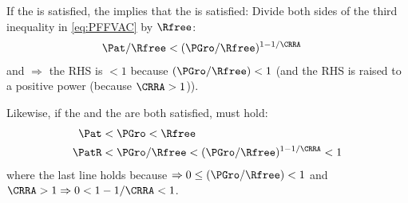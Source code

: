 \documentclass[BufferStockTheory]{subfiles}
\begin{document}
If the {\FHWC} is satisfied, the {\PFFVAC} implies that the {\RIC} is satisfied: Divide both sides of the third inequality in \eqref{eq:PFFVAC} by $\Rfree$:
\begin{align}
   \Pat/\Rfree & < (\PGro/\Rfree)^{1-1/\CRRA}  \label{eq:FHWCandPFFVACimplyRIC}
\end{align}
and {\FHWC} $\Rightarrow$ the RHS is $< 1$ because $(\PGro/\Rfree) < 1$ (and the RHS is raised to a positive power (because $\CRRA>1$)).

Likewise, if the {\FHWC} and the {\GIC} are both satisfied, {\PFFVAC} must hold:
\begin{align}
 \Pat & < \PGro < \Rfree \notag
\\   \PatR & < \PGro/\Rfree < (\PGro/\Rfree)^{1-1/\CRRA} < 1\label{eq:GICandFHWCimplyPFFVAC}
\end{align}
where the last line holds because {\FHWC} $\Rightarrow 0 \leq (\PGro/\Rfree) < 1$ and $\CRRA > 1 \Rightarrow 0 < 1-1/\CRRA < 1$.

\begin{comment}
\begin{align}
  \vLevBF_{t}  & = \uFunc(\cRat_{t})+\DiscFac \uFunc(\cRat_{t}\Pat)+\DiscFac^{2} \uFunc(\cRat_{t} \Pat^{2})+... \label{eq:ValuePFAnalyticalAutarky}
  \\  & = \uFunc(\cRat_{t})\left(1+\DiscFac \Pat^{1-\CRRA}+(\DiscFac \Pat^{1-\CRRA})^{2}+...\right) \notag 
  \\  & = \uFunc(\cRat_{t})\left(\frac{1-(\DiscFac \Pat^{1-\CRRA})^{T-t+1}}{1-\DiscFac \Pat^{1-\CRRA}}\right) \notag
  \\  & = \left(\frac{\uFunc(1-\PatR)}{1-\DiscFac \Pat^{1-\CRRA}}\right) \notag
  \\  & \propto \left(\frac{(1-\PatR)^{1-\CRRA}}{1-\DiscFac \Pat^{1-\CRRA}}\right) \notag      \end{align}
\end{comment}


\end{document}
